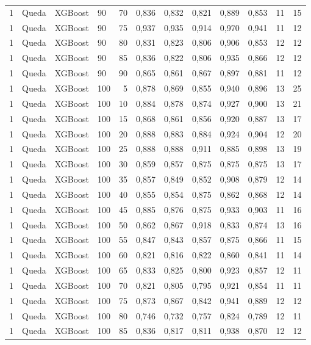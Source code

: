 \begin{longtable}{ccclrrrrrrrr}
1 & Queda & XGBoost & 90 & 70 & 0,836 & 0,832 & 0,821 & 0,889 & 0,853 & 11 & 15 \\
1 & Queda & XGBoost & 90 & 75 & 0,937 & 0,935 & 0,914 & 0,970 & 0,941 & 11 & 12 \\
1 & Queda & XGBoost & 90 & 80 & 0,831 & 0,823 & 0,806 & 0,906 & 0,853 & 12 & 12 \\
1 & Queda & XGBoost & 90 & 85 & 0,836 & 0,822 & 0,806 & 0,935 & 0,866 & 12 & 12 \\
1 & Queda & XGBoost & 90 & 90 & 0,865 & 0,861 & 0,867 & 0,897 & 0,881 & 11 & 12 \\
1 & Queda & XGBoost & 100 & 5 & 0,878 & 0,869 & 0,855 & 0,940 & 0,896 & 13 & 25 \\
1 & Queda & XGBoost & 100 & 10 & 0,884 & 0,878 & 0,874 & 0,927 & 0,900 & 13 & 21 \\
1 & Queda & XGBoost & 100 & 15 & 0,868 & 0,861 & 0,856 & 0,920 & 0,887 & 13 & 17 \\
1 & Queda & XGBoost & 100 & 20 & 0,888 & 0,883 & 0,884 & 0,924 & 0,904 & 12 & 20 \\
1 & Queda & XGBoost & 100 & 25 & 0,888 & 0,888 & 0,911 & 0,885 & 0,898 & 13 & 19 \\
1 & Queda & XGBoost & 100 & 30 & 0,859 & 0,857 & 0,875 & 0,875 & 0,875 & 13 & 17 \\
1 & Queda & XGBoost & 100 & 35 & 0,857 & 0,849 & 0,852 & 0,908 & 0,879 & 12 & 14 \\
1 & Queda & XGBoost & 100 & 40 & 0,855 & 0,854 & 0,875 & 0,862 & 0,868 & 12 & 14 \\
1 & Queda & XGBoost & 100 & 45 & 0,885 & 0,876 & 0,875 & 0,933 & 0,903 & 11 & 16 \\
1 & Queda & XGBoost & 100 & 50 & 0,862 & 0,867 & 0,918 & 0,833 & 0,874 & 13 & 16 \\
1 & Queda & XGBoost & 100 & 55 & 0,847 & 0,843 & 0,857 & 0,875 & 0,866 & 11 & 15 \\
1 & Queda & XGBoost & 100 & 60 & 0,821 & 0,816 & 0,822 & 0,860 & 0,841 & 11 & 14 \\
1 & Queda & XGBoost & 100 & 65 & 0,833 & 0,825 & 0,800 & 0,923 & 0,857 & 12 & 11 \\
1 & Queda & XGBoost & 100 & 70 & 0,821 & 0,805 & 0,795 & 0,921 & 0,854 & 11 & 11 \\
1 & Queda & XGBoost & 100 & 75 & 0,873 & 0,867 & 0,842 & 0,941 & 0,889 & 12 & 12 \\
1 & Queda & XGBoost & 100 & 80 & 0,746 & 0,732 & 0,757 & 0,824 & 0,789 & 12 & 11 \\
1 & Queda & XGBoost & 100 & 85 & 0,836 & 0,817 & 0,811 & 0,938 & 0,870 & 12 & 12 \\

\end{longtable}
